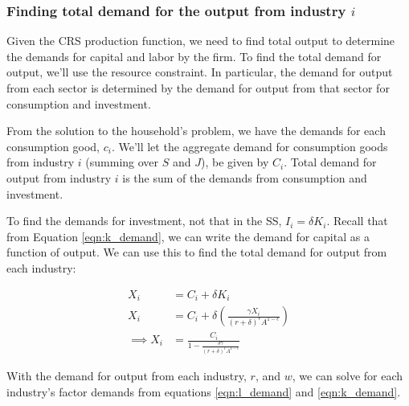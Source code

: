\documentclass[letterpaper,12pt]{article}
\theoremstyle{definition}
\begin{document}
\begin{spacing}{1.5}
\subsubsection*{Finding total demand for the output from industry $i$}

Given the CRS production function, we need to find total output to determine the demands for capital and labor by the firm.  To find the total demand for output, we'll use the resource constraint.  In particular, the demand for output from each sector is determined by the demand for output from that sector for consumption and investment.

From the solution to the household's problem, we have the demands for each consumption good, $c_{i}$.  We'll let the aggregate demand for consumption goods from industry $i$ (summing over $S$ and $J$), be given by $C_{i}$.  Total demand for output from industry $i$ is the sum of the demands from consumption and investment.

To find the demands for investment, not that in the SS, $I_{i}=\delta K_{i}$.  Recall that from Equation \ref{eqn:k_demand}, we can write the demand for capital as a function of output.  We can use this to find the total demand for output from each industry:

\begin{equation}
\label{eqn:find_output}
\begin{split}
X_{i} &= C_{i} + \delta K_{i} \\
X_{i} &= C_{i} + \delta \left(\frac{\gamma X_{i}}{(r+\delta)^{\epsilon}A^{1-\epsilon}} \right)\\
\implies X_{i} &= \frac{C_{i}}{1-\frac{\delta \gamma}{(r+\delta)^{\epsilon}A^{1-\epsilon}}}
\end{split}
\end{equation}  

With the demand for output from each industry, $r$, and $w$, we can solve for each industry's factor demands from equations \ref{eqn:l_demand} and \ref{eqn:k_demand}.


\end{spacing}
\end{document}
